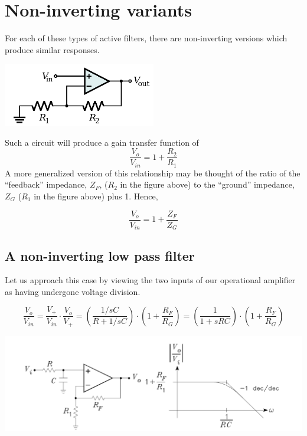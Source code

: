 \documentclass[11pt]{book}
\begin{document}
\section{Non-inverting variants}
For each of these types of active filters, there are non-inverting versions which produce similar responses.

\begin{center}
	\includegraphics[width=0.5\textwidth]{figures/15.06.png}
\end{center}

Such a circuit will produce a gain transfer function of 
\begin{equation}
	\frac{V_o}{V_{in}} = 1 + \frac{R_2}{R_1}
\end{equation}
A more generalized version of this relationship may be thought of the ratio of the ``feedback'' impedance, $Z_F$, ($R_2$ in the figure above) to the ``ground'' impedance, $Z_G$ ($R_1$ in the figure above) plus 1. Hence,

\begin{equation}
	\frac{V_o}{V_{in}} = 1 + \frac{Z_F}{Z_G}
\end{equation}


\subsection{A non-inverting low pass filter}

Let us approach this case by viewing the two inputs of our operational amplifier as having undergone voltage division.

\begin{equation}
	\frac{V_o}{V_{in}} = \frac{V_+}{V_{in}}\cdot \frac{V_o}{V_+} = \left(\frac{1/sC}{R+ 1/sC}\right)\cdot\left(1+ \frac{R_F}{R_G}\right) = \left(\frac{1}{1 + sRC}\right)\cdot\left(1+ \frac{R_F}{R_G}\right) 
\end{equation}

\begin{center}
	\includegraphics[width=\textwidth]{figures/15.04.png}
\end{center}
\end{document}
